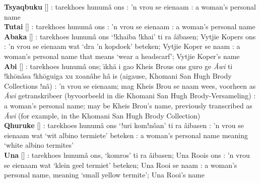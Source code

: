 \textbf{Tsyaqbuku}
[]
: tarekhoes \textdoublebarpipe{}hunum\^{a}
\textvertline{}ons : 'n vrou se eienaam :
a woman's personal name \\

\textbf{Tutai} [] : tarekhoes
\textdoublebarpipe{}hunum\^{a} \textvertline{}ons : 'n
vrou se eienaam : a woman's personal name \\

\textbf{\textvertline{}Abaka} []
: tarekhoes \textdoublebarpipe{}hunum\^{a}
\textvertline{}ons `!khaiba !khai' ti ra
\textdoublebarpipe{}\^{a}ibasen; Vytjie Kopers \textvertline{}ons
: 'n vrou se eienaam wat `dra 'n kopdoek' beteken;
Vytjie Koper se naam : a woman's personal name that
means `wear a headscarf'; Vytjie Koper's name \\

\textbf{\textvertline{}Abi} []
: tarekhoes \textdoublebarpipe{}hunum\^{a}
\textvertline{}ons; \={\i}\textdoublevertline{}kh\={a} i gao Kheis
Brous \textvertline{}ons \textdoublebarpipe{}guro ge
\emph{\textvertline{}\^{A}wi} ti !kh\={o}\textdoublevertline{}n\^{a}sa
!kh\={o}\textdoublevertline{}guiga xu xoa\textdoublevertline{}n\^{a}he
h\^{a} is (ai\textdoublevertline{}gause, \textdoublebarpipe{}Khomani
San Hugh Brody Collections !n\^{a}) : 'n vrou se
eienaam; mag Kheis Brou se naam wees, voorheen as
\emph{\textvertline{}\^{A}wi} getranskribeer (byvoorbeeld in die
\textdoublebarpipe{}Khomani San Hugh Brody-Versameling)
: a woman's personal name; may be Kheis Brou's name,
previously transcribed as \emph{\textvertline{}\^{A}wi} (for example,
in the \textdoublebarpipe{}Khomani San Hugh Brody Collection) \\

\textbf{\textvertline{}Qhuruke}
[] : tarekhoes
\textdoublebarpipe{}hunum\^{a} \textvertline{}ons `!uri kom!n\^{o}an'
ti ra \textdoublebarpipe{}\^{a}ibasen : 'n vrou se
eienaam wat `wit albino termiete' beteken : a woman's
personal name meaning `white albino termites' \\

\textbf{\textvertline{}Una} []
: tarekhoes \textdoublebarpipe{}hunum\^{a}
\textvertline{}ons, `komros' ti ra \textdoublebarpipe{}\^{a}ibasen;
\textvertline{}Una Roois \textvertline{}ons : 'n vrou se
eienaam wat `klein geel termiet' beteken; \textvertline{}Una Rooi se
naam : a woman's personal name, meaning `small yellow
termite'; \textvertline{}Una Rooi's name \\

